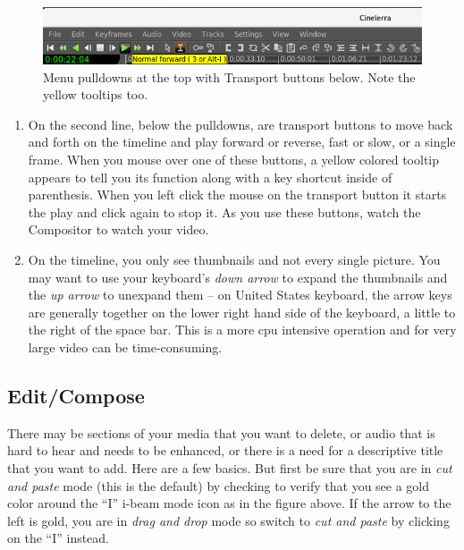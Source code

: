 \begin{figure}[htpb]
	\centering
	\includegraphics[width=1.0\linewidth]{images/pulldown_button.png}
	\caption{Menu pulldowns at the top with Transport buttons below.  Note the yellow tooltips too.}	
\end{figure}

\begin{enumerate}
	\item On the second line, below the pulldowns, are transport buttons to move back and forth on the
	timeline and play forward or reverse, fast or slow, or a single frame.  When you mouse over one of
	these buttons, a yellow colored tooltip appears to tell you its function along with a key shortcut
	inside of parenthesis.  When you left click the mouse on the transport button it starts the play and 
	click again to stop it.  As you use these buttons, watch the Compositor to watch your video.
	\item On the timeline, you only see thumbnails and not every single picture.  You may want to
	use your keyboard’s \textit{down arrow} to expand the thumbnails and the \textit{up arrow} to unexpand them -- on
	United States keyboard, the arrow keys are generally together on the lower right hand side of the
	keyboard, a little to the right of the space bar.  This is a more cpu intensive operation and for very
	large video can be time-consuming.
\end{enumerate}

\subsection{Edit/Compose}%
\label{sub:edit_compose}

There may be sections of your media that you want to delete, or audio that is hard to hear and needs to be enhanced, or there is a need for a descriptive title that you want to add.  Here are a few basics.  But first be sure that you are in \textit{cut and paste} mode (this is the default) by checking to verify that you see a gold color around the “I” i-beam mode icon as in the figure above.  If the arrow to the left is gold, you are in \textit{drag and drop} mode so switch to \textit{cut and paste} by clicking on the “I” instead.

